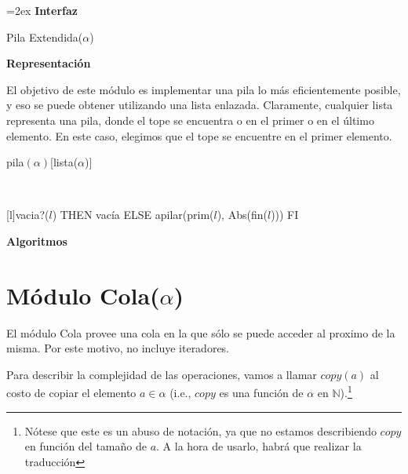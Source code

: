 \documentclass[a4paper,10pt]{article}
\newenvironment{Interfaz}{%
  \parskip=2ex%
  \noindent\textbf{\Large Interfaz}%
  \par%
}{}
\newenvironment{Representacion}{%
  \vspace*{2ex}%
  \noindent\textbf{\Large Representación}%
  \vspace*{2ex}%
}{}
\newenvironment{Algoritmos}{%
  \vspace*{2ex}%
  \noindent\textbf{\Large Algoritmos}%
  \vspace*{2ex}%
}{}
\begin{document}
\begin{Interfaz}
  \begin{tad}{Pila Extendida($\alpha$)}
    \parskip=0pt
    
    \tadAxiomas
  \end{tad}

\end{Interfaz}

\begin{Representacion}
  
  El objetivo de este módulo es implementar una pila lo más eficientemente posible, y eso se puede obtener utilizando una lista enlazada.  Claramente, cualquier lista representa una pila, donde el tope se encuentra o en el primer o en el último elemento.  En este caso, elegimos que el tope se encuentre en el primer elemento.

  \begin{Estructura}{pila$(\alpha)$}[lista($\alpha$)]
  \end{Estructura}


  ~

  [l]{\IF vacia?($l$) THEN vacía ELSE apilar(prim($l$), Abs(fin($l$))) FI}

\end{Representacion}

\begin{Algoritmos}
  
\end{Algoritmos}


\section{Módulo Cola($\alpha$)}

El módulo Cola provee una cola en la que sólo se puede acceder al proximo de la misma.  Por este motivo, no incluye iteradores.

Para describir la complejidad de las operaciones, vamos a llamar $copy(a)$ al costo de copiar el elemento $a \in \alpha$ (i.e., $copy$ es una función de $\alpha$ en $\mathbb{N}$).\footnote{Nótese que este es un abuso de notación, ya que no estamos describiendo $copy$ en función del tamaño de $a$.  A la hora de usarlo, habrá que realizar la traducción}
\end{document}
